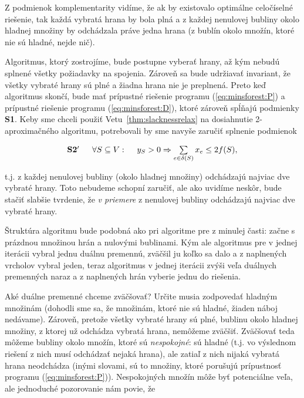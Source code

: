 \noindent
Z podmienok komplementarity vidíme, že ak by existovalo optimálne celočíselné riešenie, tak každá
vybratá hrana by bola plná a z každej nenulovej bubliny okolo hladnej množiny by  odchádzala práve jedna hrana
(z bublín okolo množín, ktoré nie sú hladné, nejde nič).

\noindent
Algoritmus, ktorý zostrojíme, 
bude postupne vyberať hrany, až kým nebudú splnené všetky požiadavky na spojenia. Zároveň
sa bude udržiavať invariant, že všetky vybraté hrany sú plné a žiadna hrana nie je preplnená.
Preto keď algoritmus skončí, bude mať prípustné riešenie programu (\ref{eq:minsforest:P}) a
prípustné riešenie programu (\ref{eq:minsforest:D}), ktoré zároveň spĺňajú podmienky {\bf S1}.
Keby sme chceli použiť Vetu~\ref{thm:slacknessrelax} na dosiahnutie 2-aproximačného algoritmu,
potrebovali by sme navyše zaručiť splnenie podmienok

$$\begin{array}{lrl}
  {\bf S2'} \;\;&\forall S\subseteq V:\;\; & y_S>0\Rightarrow \sum\limits_{e\in\delta(S)}x_e\le2f(S),
\end{array}$$

\noindent t.j. z každej nenulovej bubliny (okolo hladnej množiny) odchádzajú
najviac dve vybraté hrany. Toto nebudeme schopní zaručiť, ale ako uvidíme
neskôr, bude stačiť slabšie tvrdenie, že {\em v priemere} z nenulovej bubliny
odchádzajú najviac dve vybraté hrany.

\noindent Štruktúra algoritmu bude podobná ako pri algoritme pre \minvcover z
minulej časti: začne s prázdnou množinou hrán a nulovými bublinami.  Kým ale
algoritmus pre \minvcover v jednej iterácii vybral jednu duálnu premennú,
zväčšil ju koľko sa dalo a z naplnených vrcholov vybral jeden, teraz algoritmus
v jednej iterácii zvýši veľa duálnych premenných naraz a z naplnených hrán
vyberie jednu do riešenia.

\noindent
Aké duálne premenné chceme zväčšovať? Určite musia zodpovedať hladným množinám (dohodli sme sa, že množinám,
ktoré nie sú hladné, žiaden náboj nedávame). Zároveň, pretože všetky vybraté hrany sú plné, bublinu okolo
hladnej množiny, z ktorej už odchádza vybratá hrana, nemôžeme zväčšiť. Zväčšovať teda môžeme bubliny okolo
množín, ktoré sú {\em nespokojné}: sú hladné (t.j. vo výslednom riešení z nich musí odchádzať nejaká hrana), 
ale zatiaľ z nich nijaká vybratá hrana neodchádza (inými slovami, sú to množiny, ktoré porušujú prípustnosť
programu (\ref{eq:minsforest:P})).
Nespokojných množín môže byť potenciálne veľa, ale jednoduché pozorovanie nám povie, že

